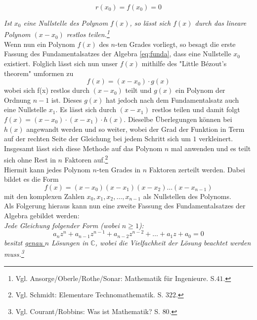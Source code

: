 \documentclass[a4paper,12pt]{article} %
\begin{document}
\begin{equation}\label{eq:bezout0}
r(x_0) = f(x_0)=0
\end{equation}


\noindent \emph{Ist $x_0$ eine Nullstelle des Polynom $f(x)$, so lässt sich $f(x)$ durch das lineare Polynom $(x-x_0)$ restlos teilen.\footnote{Vgl. Ansorge/Oberle/Rothe/Sonar: Mathematik für Ingenieure. S.$41$.}}\\



Wenn nun ein Polynom $f(x)$ des $n$-ten Grades vorliegt, so besagt die erste Fassung des Fundamentalsatzes der Algebra \eqref{eq:funda}, dass eine Nullstelle $x_0$ existiert. Folglich lässt sich nun unser $f(x)$ mithilfe des "Little Bézout's theorem" {} umformen zu
\[f(x)=(x-x_0) \cdot g(x)\]
wobei sich f(x) restlos durch $(x-x_0)$ teilt und $g(x)$ ein Polynom der Ordnung $n-1$ ist.
Dieses $g(x)$ hat jedoch nach dem Fundamentalsatz auch eine Nullstelle $x_1$.
Es lässt sich durch $(x-x_1)$ restlos teilen und damit folgt $f(x) = (x-x_0) \cdot (x-x_1) \cdot h(x)$.
Dieselbe Überlegungen können bei $h(x)$ angewandt werden und so weiter, wobei der Grad der Funktion in Term auf der rechten Seite der Gleichung bei jedem Schritt sich um $1$ verkleinert.
Insgesamt lässt sich diese Methode auf das Polynom $n$ mal anwenden und es teilt sich ohne Rest in $n$ Faktoren auf.\footnote{Vgl. Schmidt: Elementare Technomathematik. S. $322$.}\\

Hiermit kann jedes Polynom $n$-ten Grades in $n$ Faktoren zerteilt werden.
Dabei bildet es die Form
\begin{equation}\label{eq.faktor}
	\boxed{f(x)=(x-x_0)(x-x_1)(x-x_2)\dots(x-x_{n-1})}
\end{equation}
mit den komplexen Zahlen $x_0, x_1, x_2,\dots,x_{n-1}$ als Nullstellen des Polynoms.\\




Als Folgerung hieraus kann nun eine zweite Fassung des Fundamentalsatzes der Algebra gebildet werden:\\

\noindent \emph{Jede Gleichung folgender Form (wobei $n \geq 1$):
\begin{equation}\label{eq:funda2}
		a_nz^n + a_{n-1}z^{n-1} + a_{n-2}z^{n-2} + \dots + a_1z + a_0 = 0	
\end{equation}
besitzt \underline{genau $n$} Lösungen in $\mathbb{C}$, wobei die Vielfachheit der Lösung beachtet werden muss.\footnote{Vgl. Courant/Robbins: Was ist Mathematik? S. $80$.}}\\
\end{document}
